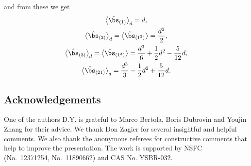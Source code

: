 \documentclass[pdftex]{sigma}
\numberwithin{equation}{section}
\begin{document}
and from these we get
\begin{gather*}
\bigl\langle\hat{\bs}_{(1)}\bigr\rangle_d = d, \\
\bigl\langle\hat{\bs}_{(2)}\bigr\rangle_d = \bigl\langle\hat{\bs}_{(1^2)}\bigr\rangle
= \frac{d^2}{2},\\
\bigl\langle\hat{\bs}_{(3)}\bigr\rangle_d = \bigl\langle\hat{\bs}_{(1^3)}\bigr\rangle
= \frac{d^3}{6} +\frac{1}{2}d^2-\frac{5}{12}d,
\\
\bigl\langle\hat{\bs}_{(21)}\bigr\rangle_d =
\frac{d^3}{3} - \frac{1}{2}d^2
+\frac{5}{12}d.
\end{gather*}


\subsection*{Acknowledgements}
One of the authors D.Y. is grateful to
Marco Bertola, Boris Dubrovin and Youjin Zhang for their advice. We thank
Don Zagier for several insightful and helpful comments. We also
thank the anonymous referees for constructive comments that help to improve the presentation.
The work is supported by NSFC (No.~12371254, No.~11890662) and
CAS No. YSBR-032.
\end{document}
